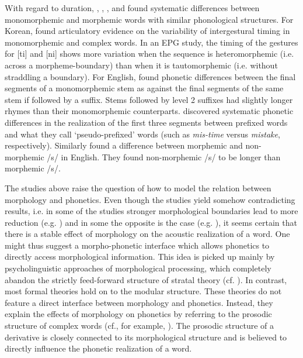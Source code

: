 With regard to duration, \cite{Cho.2001}, \cite{Sugahara.2009}, \cite{Hanique.2011}, \cite{Smith.2012} and \cite{Plag.2017} found systematic differences between monomorphemic and morphemic words with similar phonological structures. For Korean, \cite{Cho.2001} found articulatory evidence on the variability of intergestural timing in monomorphemic and complex words. In an EPG study, the timing of the gestures for [ti] and [ni] shows more variation when the sequence is heteromorphemic (i.e. across a morpheme-boundary) than when it is tautomorphemic (i.e. without straddling a boundary).
For English, \citet{Sugahara.2009} found phonetic differences between the final segments of a monomorphemic stem as against the final segments of the same stem if followed by a suffix. Stems followed by level 2 suffixes had slightly longer rhymes than their monomorphemic counterparts. \citet{Smith.2012} discovered systematic phonetic differences in the realization of the first three segments between prefixed words and what they call `pseudo-prefixed' words (such as \textit{mis-time} versus \textit{mistake}, respectively). Similarly \cite{Plag.2017} found a difference between morphemic and non-morphemic /s/ in English. They found non-morphemic /s/ to be longer than morphemic /s/. 


The studies above raise the question of how to model the relation between morphology and phonetics. Even though the studies yield somehow contradicting results, i.e. in some of the studies stronger morphological boundaries lead to more reduction (e.g. \citealt{Sugahara.2009, Smith.2012}) and in some the opposite is the case (e.g. \citealt{Schuppler.2012, Plag.2017}), it seems certain that there is a stable effect of morphology on the acoustic realization of a word. One might thus suggest a morpho-phonetic interface which allows phonetics to directly access morphological information. This idea is picked up mainly by psycholinguistic approaches of morphological processing, which completely abandon the strictly feed-forward structure of stratal theory (cf. ). 
In contrast, most formal theories hold on to the modular structure. These theories do not feature a direct interface between morphology and phonetics. Instead, they explain the effects of morphology on phonetics by referring to the prosodic structure of complex words (cf., for example, \citealt{Booij.1983b,Sproat.1993,Nespor.2007,Sugahara.2009,Bergmann.}). The prosodic structure of a derivative is closely connected to its morphological structure and is believed to directly influence the phonetic realization of a word. 

